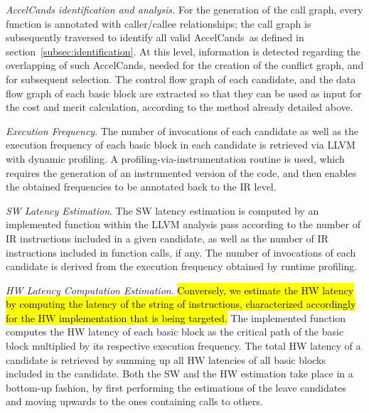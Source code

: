 \documentclass[]{usiinfthesis}
\newcommand{\candidates}{{AccelCand}s}
\begin{document}
\emph{AccelCands identification and analysis.} For the generation of
the call graph, every function is annotated with caller/callee relationships; 
the call graph is subsequently traversed to identify all valid \candidates\ as 
defined in section~\ref{subsec:identification}. At this level, information is 
detected regarding the overlapping of such \candidates, needed for the creation 
of the conflict graph, and for subsequent selection. The control flow graph of 
each candidate, and the data flow graph of each basic block are extracted so 
that they can be used as input for the cost and merit calculation, according to 
the method already detailed above.\par

\emph{Execution Frequency}.  The number of invocations of each
candidate as well as the execution frequency of each basic block in
each candidate is retrieved via LLVM with dynamic profiling. A
profiling-via-instrumentation routine is used, which requires the generation
of an instrumented version of the code, and then enables the obtained
frequencies to be annotated back to the IR level.\par

\emph{SW Latency Estimation}. The SW latency estimation is 
computed by an implemented function within the LLVM analysis pass
according to the number of IR instructions included in a given candidate,
as well as the number of IR instructions included in function calls, if
any.
The number of invocations of each candidate is derived from the execution 
frequency obtained by runtime profiling.
\par

\emph{HW Latency Computation Estimation}. 
\hl{
Conversely, we estimate the HW latency 
by computing the latency of the string of
instructions, characterized accordingly for the HW implementation
that is being targeted. 
}
The implemented function computes the HW
latency of each basic block as the critical path of the basic block
multiplied by its respective execution frequency. The total HW latency
of a candidate is retrieved by summing up all HW latencies of all basic 
blocks included in the candidate. 
Both the SW and the HW estimation take place in a bottom-up fashion,
by first performing the estimations of the leave candidates and moving
upwards to the ones containing calls to others.\par
\end{document}
